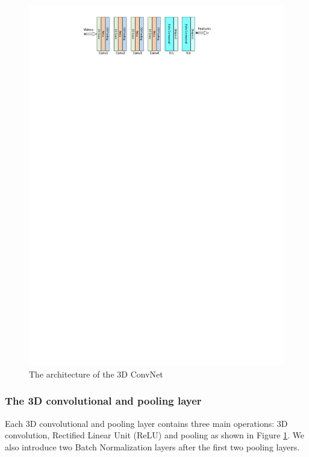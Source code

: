 \begin{figure}
	\includegraphics[trim=2cm 25.5cm 0cm 1cm]{fig01/3DConvNet.pdf}
	\caption{The architecture of the 3D ConvNet}
	\label{fig:3DConvNet_4}
\end{figure}

\subsubsection*{The 3D convolutional and pooling layer}
Each 3D convolutional and pooling layer contains three main operations: 3D convolution, Rectified Linear Unit (ReLU) and pooling as shown in Figure \ref{fig:3DConvNet_4}. We also introduce two Batch Normalization \cite{bn} layers after the first two pooling layers.   
